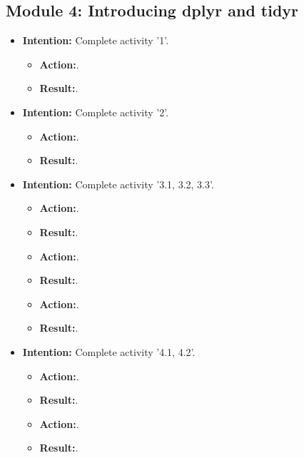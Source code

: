 \documentclass{article}
\begin{document}
\subsection{Module 4: Introducing dplyr and tidyr}

\begin{itemize}

\item{\textbf{Intention:} Complete activity '1'.}

\begin{itemize}
\item{\textbf{Action:}.}
\item{\textbf{Result:}.}
\end{itemize}

\item{\textbf{Intention:} Complete activity '2'.}

\begin{itemize}
\item{\textbf{Action:}.}
\item{\textbf{Result:}.}
\end{itemize}

\item{\textbf{Intention:} Complete activity '3.1, 3.2, 3.3'.}

\begin{itemize}
\item{\textbf{Action:}.}
\item{\textbf{Result:}.}

\item{\textbf{Action:}.}
\item{\textbf{Result:}.}

\item{\textbf{Action:}.}
\item{\textbf{Result:}.}


\end{itemize}

\item{\textbf{Intention:} Complete activity '4.1, 4.2'.}

\begin{itemize}
\item{\textbf{Action:}.}
\item{\textbf{Result:}.}

\item{\textbf{Action:}.}
\item{\textbf{Result:}.}


\end{itemize}




 
\end{itemize}
\end{document}
